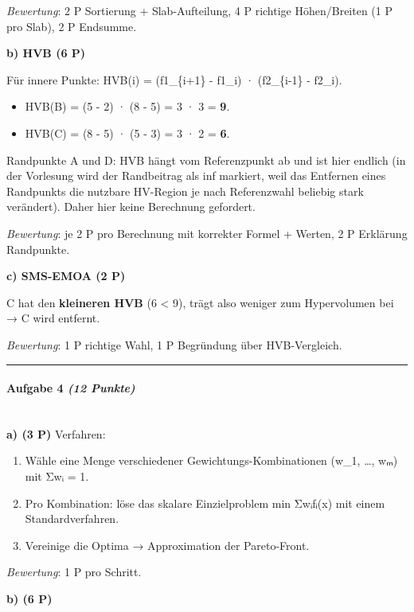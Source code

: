 \documentclass[11pt, a4paper]{article}
\begin{document}
\textit{Bewertung}: 2 P Sortierung + Slab-Aufteilung, 4 P richtige Höhen/Breiten (1 P pro Slab), 2 P Endsumme.


\textbf{b) HVB (6 P)}


Für innere Punkte: HVB(i) = (f1\_\{i+1\} - f1\_i) · (f2\_\{i-1\} - f2\_i).


\begin{itemize}
  \item HVB(B) = (5 - 2) · (8 - 5) = 3 · 3 = \textbf{9}.
  \item HVB(C) = (8 - 5) · (5 - 3) = 3 · 2 = \textbf{6}.
\end{itemize}

Randpunkte A und D: HVB hängt vom Referenzpunkt ab und ist hier endlich (in der Vorlesung wird der Randbeitrag als inf markiert, weil das Entfernen eines Randpunkts die nutzbare HV-Region je nach Referenzwahl beliebig stark verändert). Daher hier keine Berechnung gefordert.


\textit{Bewertung}: je 2 P pro Berechnung mit korrekter Formel + Werten, 2 P Erklärung Randpunkte.


\textbf{c) SMS-EMOA (2 P)}


C hat den \textbf{kleineren HVB} (6 < 9), trägt also weniger zum Hypervolumen bei → C wird entfernt.


\textit{Bewertung}: 1 P richtige Wahl, 1 P Begründung über HVB-Vergleich.



\noindent\textcolor{rulegray}{\rule{\linewidth}{0.4pt}}


\paragraph{Aufgabe 4 \textit{(12 Punkte)}}\mbox{}\\[2pt]

\textbf{a) (3 P)} Verfahren:

\begin{enumerate}
  \item Wähle eine Menge verschiedener Gewichtungs-Kombinationen (w\_1, …, wₘ) mit Σwᵢ = 1.
  \item Pro Kombination: löse das skalare Einzielproblem min Σwᵢfᵢ(x⃗) mit einem Standardverfahren.
  \item Vereinige die Optima → Approximation der Pareto-Front.
\end{enumerate}

\textit{Bewertung}: 1 P pro Schritt.


\textbf{b) (6 P)}
\end{document}
